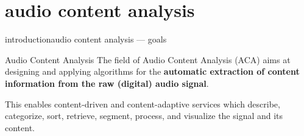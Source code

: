     \section[aca]{audio content analysis}
        \begin{frame}{introduction}{audio content analysis --- goals}
            \begin{block}{Audio Content Analysis}
                The field of Audio Content Analysis (ACA) aims at designing and applying algorithms for the \textbf{automatic extraction of content information from the raw (digital) audio signal}. 
                
                This enables content-driven and content-adaptive services which describe, categorize, sort, retrieve, segment, process, and visualize the signal and its content.                
            \end{block}
        \end{frame}
        
